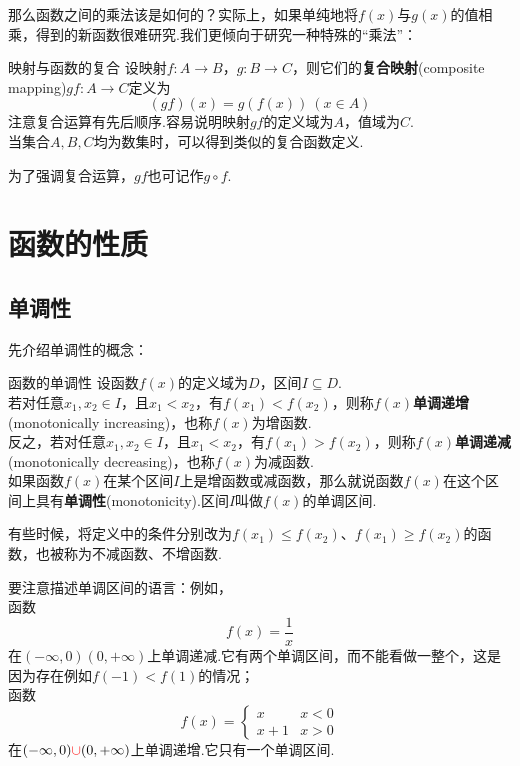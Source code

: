 \documentclass[lang=cn, zihao=5]{elegantbook}
\begin{document}
那么函数之间的乘法该是如何的？实际上，如果单纯地将$f(x)$与$g(x)$的值相乘，得到的新函数很难研究.我们更倾向于研究一种特殊的“乘法”：

\begin{definition}{映射与函数的复合} %
    设映射$f:A \to B$，$g:B \to C$，则它们的\textbf{复合映射}(composite mapping)$gf:A \to C$定义为$$(gf)(x)=g(f(x)) \ (x \in A)$$
    注意复合运算有先后顺序.容易说明映射$gf$的定义域为$A$，值域为$C$.\\
    当集合$A,B,C$均为数集时，可以得到类似的复合函数定义.
\end{definition}
\begin{remark}
	为了强调复合运算，$gf$也可记作$g \circ f$.
\end{remark}

\section{函数的性质}

\subsection{单调性}

先介绍单调性的概念：

\begin{definition}{函数的单调性} %
    设函数$f(x)$的定义域为$D$，区间$I \subseteq D$.\\
    若对任意$x_1,x_2 \in I$，且$x_1 < x_2$，有$f(x_1) < f(x_2)$，则称$f(x)$\textbf{单调递增}(monotonically increasing)，也称$f(x)$为增函数.\\
    反之，若对任意$x_1,x_2 \in I$，且$x_1 < x_2$，有$f(x_1) > f(x_2)$，则称$f(x)$\textbf{单调递减}(monotonically decreasing)，也称$f(x)$为减函数.\\
    如果函数$f(x)$在某个区间$I$上是增函数或减函数，那么就说函数$f(x)$在这个区间上具有\textbf{单调性}(monotonicity).区间$I$叫做$f(x)$的单调区间.
\end{definition}
\begin{remark}
    有些时候，将定义中的条件分别改为$f(x_1) \leq f(x_2)$、$f(x_1) \geq f(x_2)$的函数，也被称为不减函数、不增函数.
\end{remark}
\begin{note}
    要注意描述单调区间的语言：例如，\\
    函数$$f(x)=\frac{1}{x}$$
    在$(- \infty , 0)$\color{red}{和}\color{black}$(0 , + \infty)$上单调递减.它有两个单调区间，而不能看做一整个，这是因为存在例如$f(-1) < f(1)$的情况；\\
    函数$$ f(x)=\begin{cases}
    	x &x<0 \\
    	x+1 &x>0
    \end{cases}$$
    在$(- \infty , 0) \color{red}{\cup}\color{black} (0 , + \infty)$上单调递增.它只有一个单调区间.
\end{note}
\end{document}
